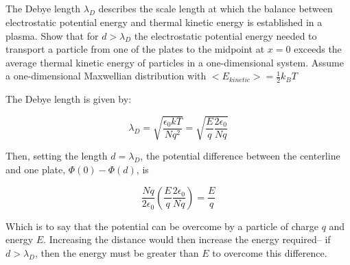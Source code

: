\documentclass{template}
\begin{document}
\subsection{}

The Debye length $\lambda_D$ describes the scale length at which the balance between electrostatic potential energy and thermal kinetic energy is established in a plasma. Show that for $d > \lambda_D$ the electrostatic potential energy needed to transport a particle from one of the plates to the midpoint at $x=0$ exceeds the average thermal kinetic energy of particles in a one-dimensional system. Assume a one-dimensional Maxwellian distribution with $<E_{kinetic}>=\frac{1}{2}k_B T$

The Debye length is given by:

\begin{equation}
    \lambda_D = \sqrt{\frac{\epsilon_0 k T}{Nq^2}} = \sqrt{\frac{E}{q} \frac{2\epsilon_0}{Nq}}
\end{equation}

Then, setting the length $d=\lambda_D$, the potential difference between the centerline and one plate, $\Phi(0) - \Phi(d)$, is

\begin{equation}
    \frac{Nq}{2\epsilon_0} (\frac{E}{q} \frac{2\epsilon_0}{Nq}) = \frac{E}{q}
\end{equation}

Which is to say that the potential can be overcome by a particle of charge $q$ and energy $E$. Increasing the distance would then increase the energy required-- if $d>\lambda_D$, then the energy must be greater than $E$ to overcome this difference.



% 
% 
\end{document}

